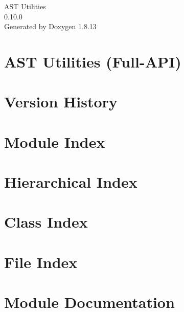 \documentclass[twoside]{book}
\newcommand{\+}{\discretionary{\mbox{\scriptsize$\hookleftarrow$}}{}{}}
\newcommand{\clearemptydoublepage}{%
  \newpage{\pagestyle{empty}\cleardoublepage}%
}
\begin{document}
\hypersetup{pageanchor=false,
             bookmarksnumbered=true,
             pdfencoding=unicode
            }
\begin{titlepage}
\vspace*{7cm}
\begin{center}%
{\Large A\+ST Utilities \\[1ex]\large 0.\+10.\+0 }\\
\vspace*{1cm}
{\large Generated by Doxygen 1.8.13}\\
\end{center}
\end{titlepage}
\clearemptydoublepage
{}
\tableofcontents
\clearemptydoublepage
{}
\hypersetup{pageanchor=true}

\chapter{A\+ST Utilities (Full-\/\+A\+PI)}
\label{index}\hypertarget{index}{}
\chapter{Version History}
\label{CHANGES}

\chapter{Module Index}

\chapter{Hierarchical Index}

\chapter{Class Index}

\chapter{File Index}

\chapter{Module Documentation}







\end{document}
